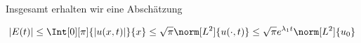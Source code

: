 \begin{solution}
\begin{enumerate}[label = (\roman*)]
  Insgesamt erhalten wir eine Abschätzung

  \begin{align*}
    |E(t)|
    \leq
    \Int[0][\pi]{|u(x,t)|}{x}
    \leq
    \sqrt{\pi} \norm[L^2]{u(\cdot,t)}
    \leq
    \sqrt{\pi} e^{\lambda_1 t}\norm[L^2]{u_0}
  \end{align*}
  \end{enumerate}
\end{solution}
